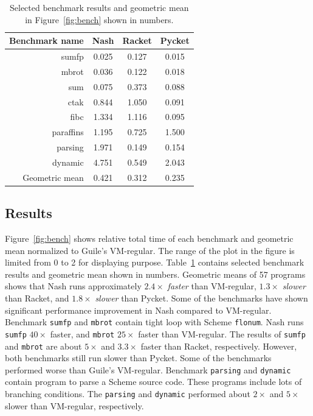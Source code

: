 \documentclass[preprint, 10pt]{sigplanconf}
\begin{document}
\begin{table}
  \centering
  \begin{tabular}{rccc}
    \toprule
    Benchmark name & Nash & Racket & Pycket \\
    \midrule
    sumfp & 0.025 & 0.127 & 0.015 \\
    mbrot & 0.036 & 0.122 & 0.018 \\
    sum & 0.075 & 0.373 & 0.088 \\
    \midrule
    ctak & 0.844 & 1.050 & 0.091 \\
    fibc & 1.334 & 1.116 & 0.095 \\
    \midrule
    paraffins & 1.195 & 0.725 & 1.500 \\
    parsing & 1.971 & 0.149 & 0.154 \\
    dynamic & 4.751 & 0.549 & 2.043 \\
    \midrule
    Geometric mean & 0.421 & 0.312 & 0.235 \\
    \bottomrule
  \end{tabular}
  \caption{Selected benchmark results and geometric mean in
    Figure~\hyperref[fig:bench]{\ref{fig:bench}} shown in numbers.}
\label{tab:bench}
\end{table}

\subsection{Results}

Figure~\ref{fig:bench} shows relative total time of each benchmark and geometric
mean normalized to Guile's VM-regular. The range of the plot in the figure is
limited from 0 to 2 for displaying
purpose. Table~\hyperref[tab:bench]{\ref{tab:bench}} contains selected benchmark
results and geometric mean shown in numbers.  Geometric means of 57 programs
shows that Nash runs approximately $2.4\times$ \textit{faster} than VM-regular,
$1.3\times$ \textit{slower} than Racket, and $1.8\times$ \textit{slower} than
Pycket.  Some of the benchmarks have shown significant performance improvement
in Nash compared to VM-regular. Benchmark \texttt{sumfp} and \texttt{mbrot}
contain tight loop with Scheme \texttt{flonum}. Nash runs \texttt{sumfp}
$40\times$ faster, and \texttt{mbrot} $25\times$ faster than VM-regular. The
results of \texttt{sumfp} and \texttt{mbrot} are about $5\times$ and $3.3\times$
faster than Racket, respectively. However, both benchmarks still run slower than
Pycket.  Some of the benchmarks performed worse than Guile's
VM-regular. Benchmark \texttt{parsing} and \texttt{dynamic} contain program to
parse a Scheme source code. These programs include lots of branching
conditions. The \texttt{parsing} and \texttt{dynamic} performed about $2\times$
and $5\times$ slower than VM-regular, respectively.
\end{document}
